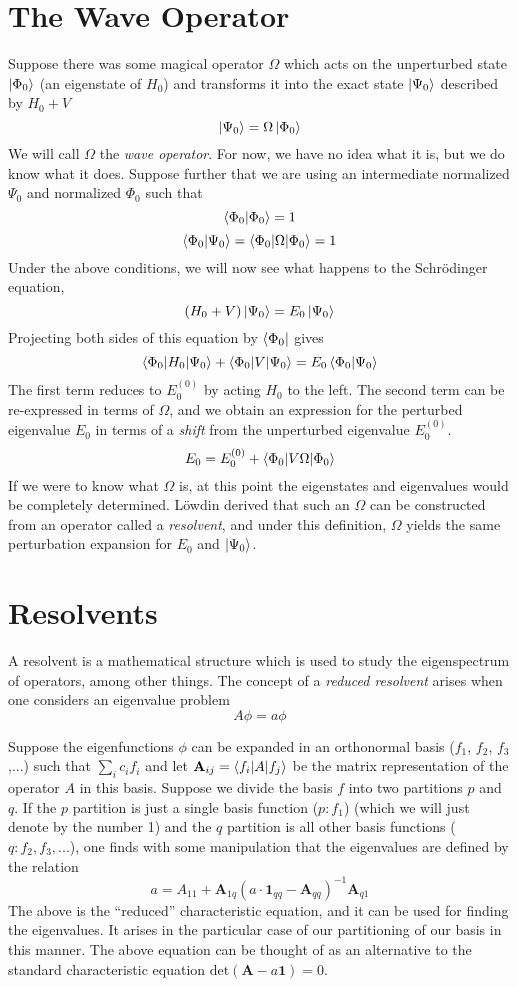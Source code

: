 \documentclass{article}
\newcommand{\Ezero}{E^{(0)}}
\begin{document}
\section{The Wave Operator}
Suppose there was some magical operator $\Omega$ which
acts on the unperturbed state $\ket{\Phi_0}$ (an eigenstate of $H_0$)
and transforms it into the exact state $\ket{\Psi_0}$ described by $H_0 + V$
\[\ket{\Psi_0} = \Omega \ket{\Phi_0} \]
We will call $\Omega$ the \textit{wave operator}.
For now, we have no idea what it is, but we do know what it does.
Suppose further that we are using an intermediate normalized $\Psi_0$ and normalized $\Phi_0$ such that
\[ \braket{\Phi_0|\Phi_0} = 1 \]
\[ \braket{\Phi_0 | \Psi_0} = \braket{\Phi_0 | \Omega | \Phi_0} = 1 \]
Under the above conditions, we will now see what happens to the Schr{\"o}dinger equation,
\[(H_0 + V) \ket{\Psi_0} = E_0 \ket{\Psi_0} \]
Projecting both sides of this equation by $\bra{\Phi_0}$ gives
\[\braket{\Phi_0 | H_0 | \Psi_0} + \braket{\Phi_0 | V | \Psi_0} = E_0 \braket{\Phi_0|\Psi_0} \]
The first term reduces to $\Ezero_0$ by acting $H_0$ to the left. The second term 
can be re-expressed in terms of $\Omega$, and we obtain an expression for the 
perturbed eigenvalue $E_0$ in terms of a \textit{shift} from the unperturbed eigenvalue $\Ezero_0$.  
\[ E_0 = \Ezero_0 + \braket{\Phi_0 | V \Omega | \Phi_0}  \]
If we were to know what $\Omega$ is, at this point the eigenstates and eigenvalues would be completely
determined.
L{\"o}wdin derived that such an $\Omega$ can be constructed from an operator called a \textit{resolvent},
and under this definition, $\Omega$ yields the same perturbation expansion for $E_0$ and $\ket{\Psi_0}$.

\section{Resolvents}
A resolvent is a mathematical structure which is used to study the eigenspectrum
of operators, among other things.
The concept of a \textit{reduced resolvent} arises when one considers an eigenvalue problem \[A \phi = a \phi \]

Suppose the eigenfunctions $\phi$ can be expanded in an orthonormal basis ($f_1$, $f_2$, $f_3$,...) such that $\sum_i c_i f_i $
and let $\mathbf{A}_{ij} = \braket{f_i | A | f_j}$ be the matrix representation of the operator $A$ in this basis. 
Suppose we divide the basis $f$ into two partitions $p$ and $q$. 
If the $p$ partition is just a single basis function ($p: {f_1}$) (which we will just denote by the number 1) and the $q$ partition 
    is all other basis functions ($q: {f_2, f_3,...}$),
    one finds with some manipulation that the eigenvalues are defined by the relation 
\[ a =  A_{11} + \mathbf{A}_{1q}( a \cdot \mathbf{1}_{qq} - \mathbf{A}_{qq})^{-1} \mathbf{A}_{q1} \]
The above is the ``reduced'' characteristic equation, and it can be used for finding the eigenvalues.
It arises in the particular case of our partitioning of our basis in this manner.
The above equation can be thought of as an alternative to the standard characteristic equation $\mathrm{det}(\mathbf{A} - a\mathbf{1}) = 0$.
\end{document}
